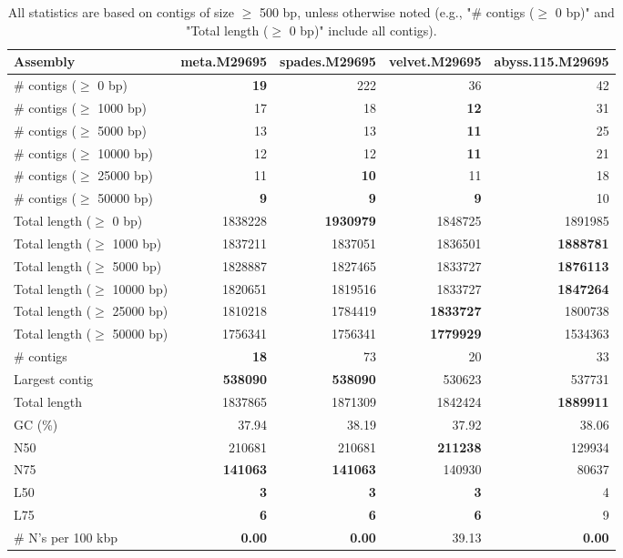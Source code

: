 \documentclass[12pt,a4paper]{article}
\begin{document}
\begin{table}[ht]
\begin{center}
\caption{All statistics are based on contigs of size $\geq$ 500 bp, unless otherwise noted (e.g., "\# contigs ($\geq$ 0 bp)" and "Total length ($\geq$ 0 bp)" include all contigs).}
\begin{tabular}{|l*{4}{|r}|}
\hline
Assembly & meta.M29695 & spades.M29695 & velvet.M29695 & abyss.115.M29695 \\ \hline
\# contigs ($\geq$ 0 bp) & {\bf 19} & 222 & 36 & 42 \\ \hline
\# contigs ($\geq$ 1000 bp) & 17 & 18 & {\bf 12} & 31 \\ \hline
\# contigs ($\geq$ 5000 bp) & 13 & 13 & {\bf 11} & 25 \\ \hline
\# contigs ($\geq$ 10000 bp) & 12 & 12 & {\bf 11} & 21 \\ \hline
\# contigs ($\geq$ 25000 bp) & 11 & {\bf 10} & 11 & 18 \\ \hline
\# contigs ($\geq$ 50000 bp) & {\bf 9} & {\bf 9} & {\bf 9} & 10 \\ \hline
Total length ($\geq$ 0 bp) & 1838228 & {\bf 1930979} & 1848725 & 1891985 \\ \hline
Total length ($\geq$ 1000 bp) & 1837211 & 1837051 & 1836501 & {\bf 1888781} \\ \hline
Total length ($\geq$ 5000 bp) & 1828887 & 1827465 & 1833727 & {\bf 1876113} \\ \hline
Total length ($\geq$ 10000 bp) & 1820651 & 1819516 & 1833727 & {\bf 1847264} \\ \hline
Total length ($\geq$ 25000 bp) & 1810218 & 1784419 & {\bf 1833727} & 1800738 \\ \hline
Total length ($\geq$ 50000 bp) & 1756341 & 1756341 & {\bf 1779929} & 1534363 \\ \hline
\# contigs & {\bf 18} & 73 & 20 & 33 \\ \hline
Largest contig & {\bf 538090} & {\bf 538090} & 530623 & 537731 \\ \hline
Total length & 1837865 & 1871309 & 1842424 & {\bf 1889911} \\ \hline
GC (\%) & 37.94 & 38.19 & 37.92 & 38.06 \\ \hline
N50 & 210681 & 210681 & {\bf 211238} & 129934 \\ \hline
N75 & {\bf 141063} & {\bf 141063} & 140930 & 80637 \\ \hline
L50 & {\bf 3} & {\bf 3} & {\bf 3} & 4 \\ \hline
L75 & {\bf 6} & {\bf 6} & {\bf 6} & 9 \\ \hline
\# N's per 100 kbp & {\bf 0.00} & {\bf 0.00} & 39.13 & {\bf 0.00} \\ \hline
\end{tabular}
\end{center}
\end{table}
\end{document}
